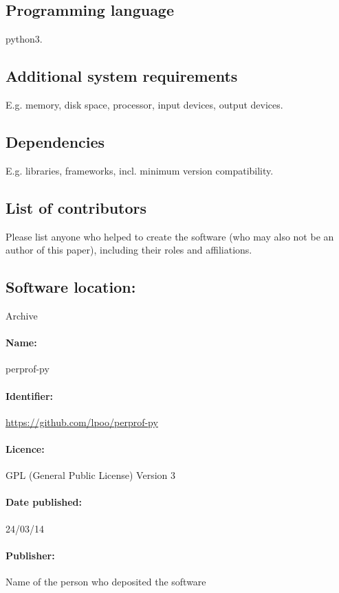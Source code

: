 \documentclass[10pt,a4paper]{article}
\begin{document}
\subsection*{Programming language}
python3.

\subsection*{Additional system requirements}
E.g. memory, disk space, processor, input devices, output devices.

\subsection*{Dependencies}
E.g. libraries, frameworks, incl. minimum version compatibility.

\subsection*{List of contributors}
Please list anyone who helped to create the software (who may also not be an author of this paper), including their roles and affiliations.

\subsection*{Software location:}
Archive

\paragraph{Name:} perprof-py

\paragraph{Identifier:} \url{https://github.com/lpoo/perprof-py}

\paragraph{Licence:} GPL (General Public License) Version 3

\paragraph{Date published:} 24/03/14

\paragraph{Publisher:} Name of the person who deposited the software
\end{document}
